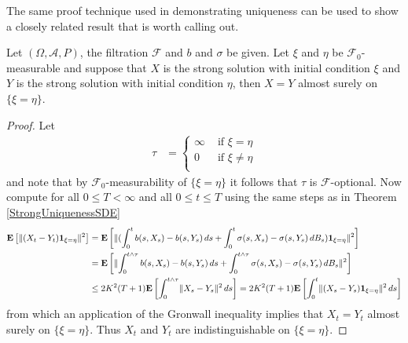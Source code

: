 The same proof technique used in demonstrating uniqueness can be used to show a closely related result that is worth calling out.
\begin{prop}\label{StrongUniquenessSDEExtended}Let $(\Omega, \mathcal{A}, P)$, the filtration $\mathcal {F}$ and $b$ and $\sigma$ be given.  Let $\xi$ and $\eta$ be $\mathcal{F}_0$-measurable and suppose that $X$ is the strong solution with initial condition $\xi$ and $Y$ is the strong solution with initial condition $\eta$, then $X = Y$ almost surely on $\lbrace \xi = \eta \rbrace$.
\end{prop}
\begin{proof}
Let 
\begin{align*}
\tau &= \begin{cases}
\infty & \text{ if $\xi = \eta$} \\
0 & \text{ if $\xi \neq \eta$} \\
\end{cases}
\end{align*}
and note that by $\mathcal{F}_0$-measurability of $\lbrace \xi = \eta \rbrace$ it follows that $\tau$ is $\mathcal{F}$-optional.  Now compute for all $0 \leq T < \infty$ and all $0 \leq t \leq T$ using the same steps
as in Theorem \ref{StrongUniquenessSDE} 
\begin{align*}
\textbf{E}\left[\lVert (X_t - Y_t) \textbf{1}_{\xi = \eta} \rVert^2\right] &=
\textbf{E}\left[\lVert (\int_0^t b(s,X_s) - b(s,Y_s) \, ds + \int_0^t \sigma(s,X_s) - \sigma(s,Y_s) \, dB_s) \textbf{1}_{\xi = \eta} \rVert^2\right] \\
&=\textbf{E}\left[\lVert \int_0^{t\wedge \tau}  b(s,X_s) - b(s,Y_s) \, ds + \int_0^{t \wedge \tau} \sigma(s,X_s) - \sigma(s,Y_s) \, dB_s \rVert^2\right]  \\
&\leq 2 K^2 (T + 1) \textbf{E}\left[\int_0^{t \wedge \tau} \lVert X_s - Y_s \rVert^2 \, ds\right] = 2 K^2 (T + 1) \textbf{E}\left[\int_0^t \lVert (X_s - Y_s) \textbf{1}_{\xi = \eta} \rVert^2 \, ds\right] 
\end{align*}
from which an application of the Gronwall inequality implies that $X_t = Y_t$ almost surely on $\lbrace \xi = \eta \rbrace$.  Thus $X_t$ and $Y_t$ are indistinguishable on 
$\lbrace \xi = \eta \rbrace$.
\end{proof}

